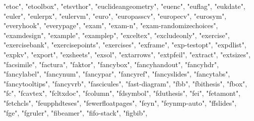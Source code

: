 \documentclass[
]{article}
\newenvironment{Shaded}{\begin{snugshade}}{\end{snugshade}}
\newcommand{\NormalTok}[1]{#1}
\newcommand{\StringTok}[1]{\textcolor[rgb]{0.31,0.60,0.02}{#1}}
\begin{document}
\begin{Shaded}
\begin{Highlighting}[]
\StringTok{"etoc"}\NormalTok{, }\StringTok{"etoolbox"}\NormalTok{, }\StringTok{"etsvthor"}\NormalTok{, }\StringTok{"euclideangeometry"}\NormalTok{, }\StringTok{"euenc"}\NormalTok{, }
\StringTok{"euflag"}\NormalTok{, }\StringTok{"eukdate"}\NormalTok{, }\StringTok{"euler"}\NormalTok{, }\StringTok{"eulerpx"}\NormalTok{, }\StringTok{"eulervm"}\NormalTok{, }\StringTok{"euro"}\NormalTok{, }\StringTok{"europasscv"}\NormalTok{, }
\StringTok{"europecv"}\NormalTok{, }\StringTok{"eurosym"}\NormalTok{, }\StringTok{"everyhook"}\NormalTok{, }\StringTok{"everypage"}\NormalTok{, }\StringTok{"exam"}\NormalTok{, }\StringTok{"exam{-}n"}\NormalTok{, }
\StringTok{"exam{-}randomizechoices"}\NormalTok{, }\StringTok{"examdesign"}\NormalTok{, }\StringTok{"example"}\NormalTok{, }\StringTok{"examplep"}\NormalTok{, }
\StringTok{"exceltex"}\NormalTok{, }\StringTok{"excludeonly"}\NormalTok{, }\StringTok{"exercise"}\NormalTok{, }\StringTok{"exercisebank"}\NormalTok{, }\StringTok{"exercisepoints"}\NormalTok{, }
\StringTok{"exercises"}\NormalTok{, }\StringTok{"exframe"}\NormalTok{, }\StringTok{"exp{-}testopt"}\NormalTok{, }\StringTok{"expdlist"}\NormalTok{, }\StringTok{"expkv"}\NormalTok{, }\StringTok{"export"}\NormalTok{, }
\StringTok{"exsheets"}\NormalTok{, }\StringTok{"exsol"}\NormalTok{, }\StringTok{"extarrows"}\NormalTok{, }\StringTok{"extpfeil"}\NormalTok{, }\StringTok{"extract"}\NormalTok{, }\StringTok{"extsizes"}\NormalTok{, }
\StringTok{"facsimile"}\NormalTok{, }\StringTok{"factura"}\NormalTok{, }\StringTok{"faktor"}\NormalTok{, }\StringTok{"fancybox"}\NormalTok{, }\StringTok{"fancyhandout"}\NormalTok{, }
\StringTok{"fancyhdr"}\NormalTok{, }\StringTok{"fancylabel"}\NormalTok{, }\StringTok{"fancynum"}\NormalTok{, }\StringTok{"fancypar"}\NormalTok{, }\StringTok{"fancyref"}\NormalTok{, }
\StringTok{"fancyslides"}\NormalTok{, }\StringTok{"fancytabs"}\NormalTok{, }\StringTok{"fancytooltips"}\NormalTok{, }\StringTok{"fancyvrb"}\NormalTok{, }\StringTok{"fascicules"}\NormalTok{, }
\StringTok{"fast{-}diagram"}\NormalTok{, }\StringTok{"fbb"}\NormalTok{, }\StringTok{"fbithesis"}\NormalTok{, }\StringTok{"fbox"}\NormalTok{, }\StringTok{"fc"}\NormalTok{, }\StringTok{"fcavtex"}\NormalTok{, }
\StringTok{"fcltxdoc"}\NormalTok{, }\StringTok{"fcolumn"}\NormalTok{, }\StringTok{"fdsymbol"}\NormalTok{, }\StringTok{"fduthesis"}\NormalTok{, }\StringTok{"fei"}\NormalTok{, }\StringTok{"fetamont"}\NormalTok{, }
\StringTok{"fetchcls"}\NormalTok{, }\StringTok{"feupphdteses"}\NormalTok{, }\StringTok{"fewerfloatpages"}\NormalTok{, }\StringTok{"feyn"}\NormalTok{, }\StringTok{"feynmp{-}auto"}\NormalTok{, }
\StringTok{"ffslides"}\NormalTok{, }\StringTok{"fge"}\NormalTok{, }\StringTok{"fgruler"}\NormalTok{, }\StringTok{"fibeamer"}\NormalTok{, }\StringTok{"fifo{-}stack"}\NormalTok{, }\StringTok{"figbib"}\NormalTok{, }

\end{Highlighting}
\end{Shaded}
\end{document}
